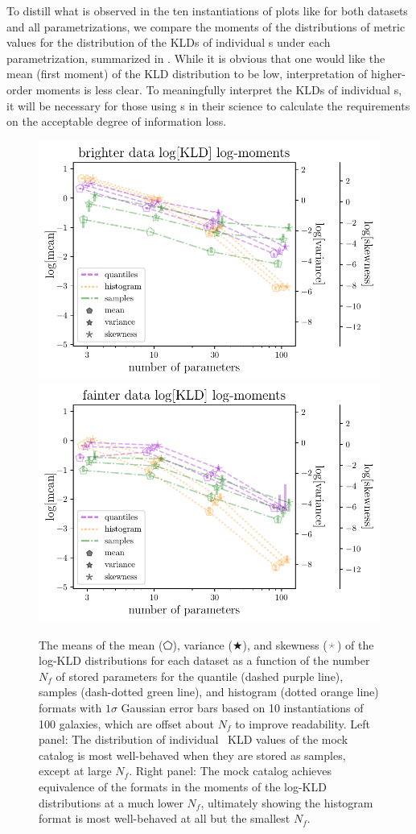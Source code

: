 To distill what is observed in the ten instantiations of plots like 
 for both datasets and all parametrizations, we 
compare the moments of the distributions of metric values for the distribution 
of the KLDs of individual \pz s under each parametrization, summarized in 
.
While it is obvious that one would like the mean (first moment) of the KLD 
distribution to be low, interpretation of higher-order moments is less clear.
To meaningfully interpret the KLDs of individual \pz s, it will be necessary 
for those using \pz s in their science to calculate the requirements on the 
acceptable degree of information loss.
\begin{figure}
	\begin{center}
		\includegraphics[width=0.5\columnwidth]{figures/qp/graham_pz_kld.pdf}
		\includegraphics[width=0.5\columnwidth]{figures/qp/schmidt_pz_kld.pdf}
		\caption{
			The means of the mean ($\pentagon$), variance ($\bigstar$), and skewness 
			($\APLstar$) of the log-KLD distributions for each dataset as a function of the 
			number $N_{f}$ of stored parameters for the quantile (dashed purple line), 
			samples (dash-dotted green line), and histogram (dotted orange line) formats 
			with $1\sigma$ Gaussian error bars based on 10 instantiations of 100 galaxies, 
			which are offset about $N_{f}$ to improve readability.
			Left panel: The distribution of individual \pz\ KLD values of the \mgdata 
			mock catalog is most well-behaved when they are stored as samples, except at 
			large $N_{f}$.
			Right panel: The \ssdata mock catalog achieves equivalence of the formats 
			in the moments of the log-KLD distributions at a much lower $N_{f}$, ultimately 
			showing the histogram format is most well-behaved at all but the smallest 
			$N_{f}$.
			}
	\end{center}
\end{figure}

